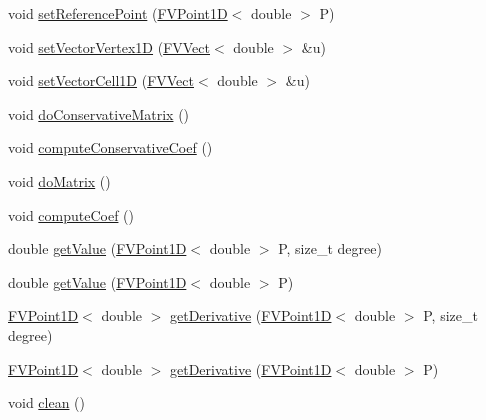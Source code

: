 \begin{DoxyCompactItemize}
\item 
void \hyperlink{classFVRecons1D_ad9a78c6c24ce1ef1e1e66ee793b71ca7}{setReferencePoint} (\hyperlink{classFVPoint1D}{FVPoint1D}$<$ double $>$ P)
\item 
void \hyperlink{classFVRecons1D_a293c577ccab7096a617b07f0da0815f4}{setVectorVertex1D} (\hyperlink{classFVVect}{FVVect}$<$ double $>$ \&u)
\item 
void \hyperlink{classFVRecons1D_a3123586ee3e9ab48cb5c7bee851a368b}{setVectorCell1D} (\hyperlink{classFVVect}{FVVect}$<$ double $>$ \&u)
\item 
void \hyperlink{classFVRecons1D_ace350e893da1fc1e34121063885b4d66}{doConservativeMatrix} ()
\item 
void \hyperlink{classFVRecons1D_a8d6d0de3223ec5b38427aac5a0b4b2a0}{computeConservativeCoef} ()
\item 
void \hyperlink{classFVRecons1D_a778ff476790db0a772b0de4670138fd1}{doMatrix} ()
\item 
void \hyperlink{classFVRecons1D_a542380877cfbecb217d6079b325bcc9b}{computeCoef} ()
\item 
double \hyperlink{classFVRecons1D_a30a9b7e0aaa2e1f1c80ce4c6f017cfe1}{getValue} (\hyperlink{classFVPoint1D}{FVPoint1D}$<$ double $>$ P, size\_\-t degree)
\item 
double \hyperlink{classFVRecons1D_a1a9db4cdf1a4cbf5990d512475cd4a9b}{getValue} (\hyperlink{classFVPoint1D}{FVPoint1D}$<$ double $>$ P)
\item 
\hyperlink{classFVPoint1D}{FVPoint1D}$<$ double $>$ \hyperlink{classFVRecons1D_a857a7b5576853dfb299e4fa53e786ac8}{getDerivative} (\hyperlink{classFVPoint1D}{FVPoint1D}$<$ double $>$ P, size\_\-t degree)
\item 
\hyperlink{classFVPoint1D}{FVPoint1D}$<$ double $>$ \hyperlink{classFVRecons1D_ae00c034b95574c81dbc8a7726d9cdecc}{getDerivative} (\hyperlink{classFVPoint1D}{FVPoint1D}$<$ double $>$ P)
\item 
void \hyperlink{classFVRecons1D_a2bbe646c052baf99f04a367ef6031d74}{clean} ()
\end{DoxyCompactItemize}


